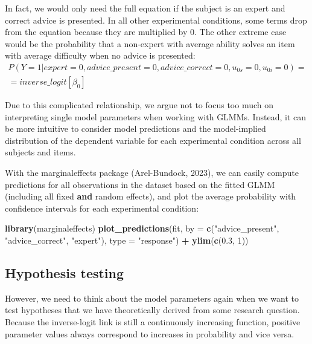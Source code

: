 \documentclass[
  man,floatsintext]{apa6}
\newenvironment{Shaded}{\begin{snugshade}}{\end{snugshade}}
\newcommand{\AttributeTok}[1]{\textcolor[rgb]{0.13,0.29,0.53}{#1}}
\newcommand{\DecValTok}[1]{\textcolor[rgb]{0.00,0.00,0.81}{#1}}
\newcommand{\FloatTok}[1]{\textcolor[rgb]{0.00,0.00,0.81}{#1}}
\newcommand{\FunctionTok}[1]{\textcolor[rgb]{0.13,0.29,0.53}{\textbf{#1}}}
\newcommand{\NormalTok}[1]{#1}
\newcommand{\SpecialCharTok}[1]{\textcolor[rgb]{0.81,0.36,0.00}{\textbf{#1}}}
\newcommand{\StringTok}[1]{\textcolor[rgb]{0.31,0.60,0.02}{#1}}
\begin{document}
In fact, we would only need the full equation if the subject is an expert and correct advice is presented. In all other experimental conditions, some terms drop from the equation because they are multiplied by \(0\). The other extreme case would be the probability that a non-expert with average ability solves an item with average difficulty when no advice is presented: \[
\begin{aligned}
P(Y=1|expert = 0, advice\_present = 0, advice\_correct = 0, u_{0s} = 0, u_{0i} = 0) = \\
= inverse\_logit[\beta_0]
\end{aligned}
\]

Due to this complicated relationship, we argue not to focus too much on interpreting single model parameters when working with GLMMs. Instead, it can be more intuitive to consider model predictions and the model-implied distribution of the dependent variable for each experimental condition across all subjects and items.

With the marginaleffects package (Arel-Bundock, 2023), we can easily compute predictions for all observations in the dataset based on the fitted GLMM (including all fixed \textbf{and} random effects), and plot the average probability with confidence intervals for each experimental condition:

\begin{Shaded}
\begin{Highlighting}[]
\FunctionTok{library}\NormalTok{(marginaleffects)}
\FunctionTok{plot\_predictions}\NormalTok{(fit, }\AttributeTok{by =} \FunctionTok{c}\NormalTok{(}\StringTok{"advice\_present"}\NormalTok{, }\StringTok{"advice\_correct"}\NormalTok{, }\StringTok{"expert"}\NormalTok{),}
  \AttributeTok{type =} \StringTok{"response"}\NormalTok{) }\SpecialCharTok{+} \FunctionTok{ylim}\NormalTok{(}\FunctionTok{c}\NormalTok{(}\FloatTok{0.3}\NormalTok{, }\DecValTok{1}\NormalTok{))}
\end{Highlighting}
\end{Shaded}

\hypertarget{hypothesis-testing}{%
\subsection{Hypothesis testing}\label{hypothesis-testing}}

However, we need to think about the model parameters again when we want to test hypotheses that we have theoretically derived from some research question. Because the inverse-logit link is still a continuously increasing function, positive parameter values always correspond to increases in probability and vice versa.
\end{document}
